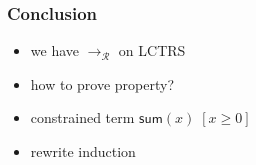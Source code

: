 \documentclass[12pt,aspectratio=169]{beamer}
\newcommand{\m}[1]{\mathsf{#1}}
\newcommand{\RR}{\mathcal{R}}
\begin{document}
\begin{frame}
    \frametitle{Conclusion}
    \begin{itemize}[<+->]
        \item we have $\to_{\RR}$ on LCTRS
            \bigskip
        \item how to prove property?
            \bigskip
        \item constrained term $\m{sum}(x)\; [x \geq 0]$
            \bigskip
        \item rewrite induction
    \end{itemize}
\end{frame}

\begin{comment}


\begin{frame}
    \begin{example}
        \begin{tabular}{ll}
            $\m{sum} : [\m{int}] \Rightarrow \m{int}$ & $\m{sum2} [\m{bool} \times \m{int}] \Rightarrow \m{int}$ \\
            $\m{0} : \m{int}$ & $\m{s} : [\m{int}] \Rightarrow \m{int}$\\
            $\m{true} : \m{bool}$ & $\m{false} :\m{bool}$
        \end{tabular}

        \begin{itemize}
            \item $\m{sum}(\m{0})$
            \item $\m{sum2}(\m{true}, \m{s}(\m{0}))$
            \item $\m{s}(\m{false})$
            \item $\m{sum2}(\m{s}(\m{0}) ,\m{ture})$
        \end{itemize}

    \end{example}
\end{frame}

\begin{frame}
    \begin{example}
    \begin{tabular}{ll}
        $\m{sum}(x) \to \m{sum2}(x) \; [x \bmod 2 = 0]$ & $\m{sum}(x) \to \m{sum2}(x - 1) \; [x \bmod 2 = 1]$\\
        $\m{sum2}(x) \to x + \m{sum2}(x-2) \; [\neg(0 \geq x)]$ & $\m{sum2}(x) \to 0 \; [0 \geq x]$
    \end{tabular}
    \end{example}
    \begin{example}
    \begin{tabular}{l}
        $\m{sum}(x) \to x + \m{sum}(x - \m{2}) \; [\neg(\m{0} \geq x) \land \m{even}(x)]$ \\
        $\m{sum}(x) \to \m{sum}(x - \m{1}) \; [\neg(\m{0} \geq x) \land \neg(\m{even}(x))]$\\
        $\m{sum}(x) \to \m{0} \; [\m{0} \geq x]$
    \end{tabular}


\end{comment}
\end{document}

